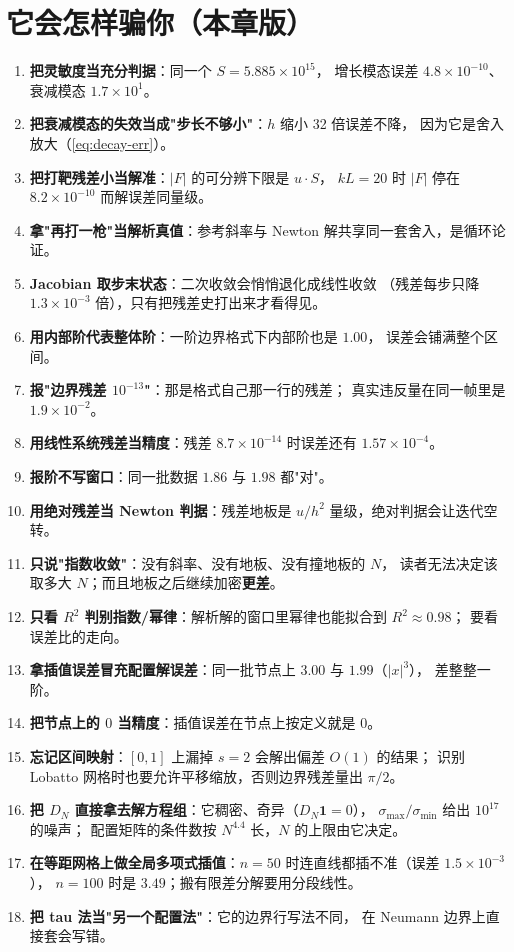 

\section{它会怎样骗你（本章版）}

\begin{enumerate}
  \item \textbf{把灵敏度当充分判据}：同一个 $S=5.885\times10^{15}$，
        增长模态误差 $4.8\times10^{-10}$、衰减模态 $1.7\times10^{1}$。
  \item \textbf{把衰减模态的失效当成"步长不够小"}：$h$ 缩小 32 倍误差不降，
        因为它是舍入放大（\eqref{eq:decay-err}）。
  \item \textbf{把打靶残差小当解准}：$|F|$ 的可分辨下限是 $u\cdot S$，
        $kL=20$ 时 $|F|$ 停在 $8.2\times10^{-10}$ 而解误差同量级。
  \item \textbf{拿"再打一枪"当解析真值}：参考斜率与 Newton 解共享同一套舍入，是循环论证。
  \item \textbf{Jacobian 取步末状态}：二次收敛会悄悄退化成线性收敛
        （残差每步只降 $1.3\times10^{-3}$ 倍），只有把残差史打出来才看得见。
  \item \textbf{用内部阶代表整体阶}：一阶边界格式下内部阶也是 $1.00$，
        误差会铺满整个区间。
  \item \textbf{报"边界残差 $10^{-13}$"}：那是格式自己那一行的残差；
        真实违反量在同一帧里是 $1.9\times10^{-2}$。
  \item \textbf{用线性系统残差当精度}：残差 $8.7\times10^{-14}$ 时误差还有 $1.57\times10^{-4}$。
  \item \textbf{报阶不写窗口}：同一批数据 $1.86$ 与 $1.98$ 都"对"。
  \item \textbf{用绝对残差当 Newton 判据}：残差地板是 $u/h^2$ 量级，绝对判据会让迭代空转。
  \item \textbf{只说"指数收敛"}：没有斜率、没有地板、没有撞地板的 $N$，
        读者无法决定该取多大 $N$；而且地板之后继续加密\textbf{更差}。
  \item \textbf{只看 $R^2$ 判别指数/幂律}：解析解的窗口里幂律也能拟合到 $R^2\approx0.98$；
        要看误差比的走向。
  \item \textbf{拿插值误差冒充配置解误差}：同一批节点上 $3.00$ 与 $1.99$（$|x|^3$），
        差整整一阶。
  \item \textbf{把节点上的 $0$ 当精度}：插值误差在节点上按定义就是 $0$。
  \item \textbf{忘记区间映射}：$[0,1]$ 上漏掉 $s=2$ 会解出偏差 $O(1)$ 的结果；
        识别 Lobatto 网格时也要允许平移缩放，否则边界残差量出 $\pi/2$。
  \item \textbf{把 $D_N$ 直接拿去解方程组}：它稠密、奇异（$D_N\mathbf{1}=0$），
        $\sigma_{\max}/\sigma_{\min}$ 给出 $10^{17}$ 的噪声；
        配置矩阵的条件数按 $N^{4.4}$ 长，$N$ 的上限由它决定。
  \item \textbf{在等距网格上做全局多项式插值}：$n=50$ 时连直线都插不准（误差 $1.5\times10^{-3}$），
        $n=100$ 时是 $3.49$；搬有限差分解要用分段线性。
  \item \textbf{把 tau 法当"另一个配置法"}：它的边界行写法不同，
        在 Neumann 边界上直接套会写错。
\end{enumerate}
